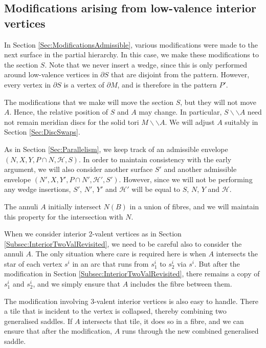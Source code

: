 \documentclass[oneside]{amsart}
\numberwithin{equation}{section}
\theoremstyle{plain}
\theoremstyle{definition}
\newcommand{\cut}{\backslash\backslash}
\begin{document}
\subsection{Modifications arising from low-valence interior vertices}

In Section \ref{Sec:ModificationsAdmissible}, various modifications were made to the next surface in the partial hierarchy.
In this case, we make these modifications to the section $S$. Note that we never insert a wedge,
since this is only performed around low-valence vertices in $\partial S$ that are disjoint from the pattern.
However, every vertex in $\partial S$ is a vertex of $\partial M$, and is therefore in the pattern $P'$.

The modifications that we make will move the section $S$, but they will not move $A$. Hence,
the relative position of $S$ and $A$ may change. In particular, $S \cut A$ need not remain
meridian discs for the solid tori $M \cut A$. We will adjust $A$ suitably in Section \ref{Sec:DiscSwaps}.

As in Section \ref{Sec:Parallelism}, we keep track of an admissible envelope
$(N, X, Y, P \cap N, \mathcal{H}, S)$. In order to maintain consistency with the early argument,
we will also consider another surface $S'$ and another admissible envelope 
$(N', X, Y', P \cap N', \mathcal{H}', S')$. However, since we will not be performing any
wedge insertions, $S'$, $N'$, $Y'$ and $\mathcal{H}'$ will be equal to $S$, $N$, $Y$ and
$\mathcal{H}$.

The annuli $A$ initially intersect $N(B)$ in a union of fibres, and we will maintain
this property for the intersection with $N$.

When we consider interior 2-valent vertices as in Section \ref{Subsec:InteriorTwoValRevisited}, we need
to be careful also to consider the annuli $A$.
The only situation where care is required here is when $A$ intersects the star of each vertex $s^i$
in an arc that runs from $s^i_1$ to $s^i_2$ via $s^i$. But after the modification in Section \ref{Subsec:InteriorTwoValRevisited},
there remains a copy of $s^i_1$ and $s^i_2$, and we simply ensure that $A$ includes the fibre between them.

The modification involving 3-valent interior vertices is also easy to handle. There a tile that is incident
to the vertex is collapsed, thereby combining two generalised saddles. If $A$ intersects that tile, it does so in a fibre,
and we can ensure that after the modification, $A$ runs through the new combined generalised saddle.
\end{document}
